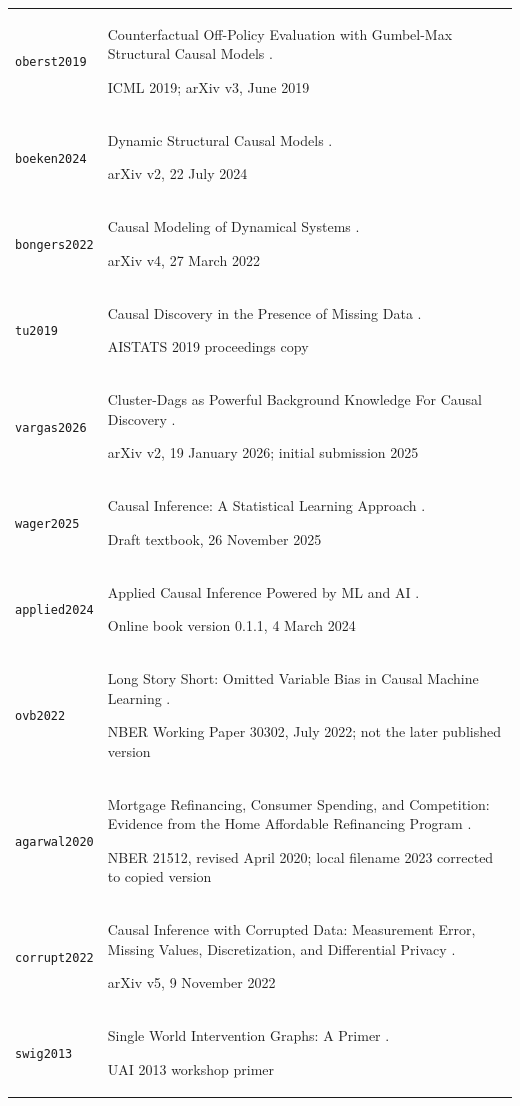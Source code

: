 \begin{longtable}{P{32mm}P{112mm}}
{\scriptsize\texttt{oberst2019}} & Counterfactual Off-Policy Evaluation with Gumbel-Max Structural Causal Models \citep{oberst2019}.\par ICML 2019; arXiv v3, June 2019\\
{\scriptsize\texttt{boeken2024}} & Dynamic Structural Causal Models \citep{boeken2024}.\par arXiv v2, 22 July 2024\\
{\scriptsize\texttt{bongers2022}} & Causal Modeling of Dynamical Systems \citep{bongers2022}.\par arXiv v4, 27 March 2022\\
{\scriptsize\texttt{tu2019}} & Causal Discovery in the Presence of Missing Data \citep{tu2019}.\par AISTATS 2019 proceedings copy\\
{\scriptsize\texttt{vargas2026}} & Cluster-Dags as Powerful Background Knowledge For Causal Discovery \citep{vargas2026}.\par arXiv v2, 19 January 2026; initial submission 2025\\
{\scriptsize\texttt{wager2025}} & Causal Inference: A Statistical Learning Approach \citep{wager2025}.\par Draft textbook, 26 November 2025\\
{\scriptsize\texttt{applied2024}} & Applied Causal Inference Powered by ML and AI \citep{applied2024}.\par Online book version 0.1.1, 4 March 2024\\
{\scriptsize\texttt{ovb2022}} & Long Story Short: Omitted Variable Bias in Causal Machine Learning \citep{ovb2022}.\par NBER Working Paper 30302, July 2022; not the later published version\\
{\scriptsize\texttt{agarwal2020}} & Mortgage Refinancing, Consumer Spending, and Competition: Evidence from the Home Affordable Refinancing Program \citep{agarwal2020}.\par NBER 21512, revised April 2020; local filename 2023 corrected to copied version\\
{\scriptsize\texttt{corrupt2022}} & Causal Inference with Corrupted Data: Measurement Error, Missing Values, Discretization, and Differential Privacy \citep{corrupt2022}.\par arXiv v5, 9 November 2022\\
{\scriptsize\texttt{swig2013}} & Single World Intervention Graphs: A Primer \citep{swig2013}.\par UAI 2013 workshop primer\\

\end{longtable}
